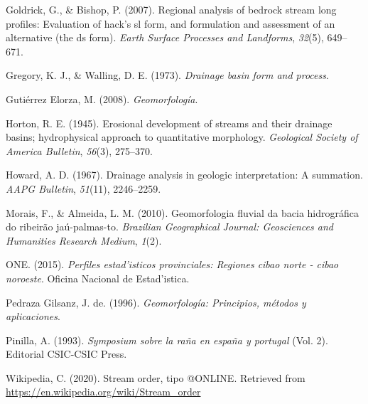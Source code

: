 \documentclass[11pt,]{article}
\begin{document}
\hypertarget{ref-goldrick2007regional}{}
Goldrick, G., \& Bishop, P. (2007). Regional analysis of bedrock stream
long profiles: Evaluation of hack's sl form, and formulation and
assessment of an alternative (the ds form). \emph{Earth Surface
Processes and Landforms}, \emph{32}(5), 649--671.

\hypertarget{ref-gregory1973drainage}{}
Gregory, K. J., \& Walling, D. E. (1973). \emph{Drainage basin form and
process}.

\hypertarget{ref-gutierrez2008geomorfologia}{}
Gutiérrez Elorza, M. (2008). \emph{Geomorfología}.

\hypertarget{ref-horton1945erosional}{}
Horton, R. E. (1945). Erosional development of streams and their
drainage basins; hydrophysical approach to quantitative morphology.
\emph{Geological Society of America Bulletin}, \emph{56}(3), 275--370.

\hypertarget{ref-howard1967drainage}{}
Howard, A. D. (1967). Drainage analysis in geologic interpretation: A
summation. \emph{AAPG Bulletin}, \emph{51}(11), 2246--2259.

\hypertarget{ref-morais2010geomorfologia}{}
Morais, F., \& Almeida, L. M. (2010). Geomorfologia fluvial da bacia
hidrográfica do ribeirão jaú-palmas-to. \emph{Brazilian Geographical
Journal: Geosciences and Humanities Research Medium}, \emph{1}(2).

\hypertarget{ref-one2015perfiles}{}
ONE. (2015). \emph{Perfiles estad'isticos provinciales: Regiones cibao
norte - cibao noroeste}. Oficina Nacional de Estad'istica.

\hypertarget{ref-pedraza1996geomorfologia}{}
Pedraza Gilsanz, J. de. (1996). \emph{Geomorfología: Principios, métodos
y aplicaciones}.

\hypertarget{ref-pinilla1993symposium}{}
Pinilla, A. (1993). \emph{Symposium sobre la raña en españa y portugal}
(Vol. 2). Editorial CSIC-CSIC Press.

\hypertarget{ref-wikipedia2020stream}{}
Wikipedia, C. (2020). Stream order, tipo @ONLINE. Retrieved from
\url{https://en.wikipedia.org/wiki/Stream_order}




\newpage
\singlespacing 
\end{document}
